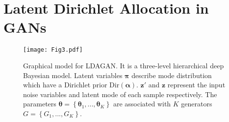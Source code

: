 \documentclass{article}
\begin{document}
\section{Latent Dirichlet Allocation in GANs}
\label{sec:LDAGAN}
\begin{figure}
  \centering
    \texttt{[image: Fig3.pdf]}
     \caption{Graphical model for LDAGAN. It is a three-level hierarchical deep Bayesian model. Latent variables $\bm{\pi}$ describe mode distribution which have a Dirichlet prior $\text{Dir}(\bm{\alpha})$. $\mathbf{z}'$ and $\mathbf{z}$ represent the input noise variables and latent mode of each sample respectively. The parameters $\bm{\theta}=\left\{\bm{\theta}_1,...,\bm{\theta}_K\right\}$ are associated with $K$ generators $G=\left\{G_1,...,G_K\right\}$. }
     \label{fig:LDA-GAN}
\end{figure}
\end{document}
